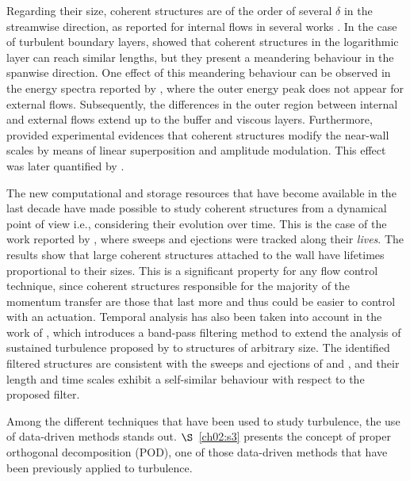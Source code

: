 Regarding their size, coherent structures are of the order of several $\delta$ in the streamwise direction, as reported for internal flows in several works \citep{kim1999very,guala2006large,monty2007large}.
In the case of turbulent boundary layers, \citet{hutchins2007evidence} showed that coherent structures in the logarithmic layer can reach similar lengths, but they present a meandering behaviour in the spanwise direction.
One effect of this meandering behaviour can be observed in the energy spectra reported by \citet{monty2009comparison}, where the outer energy peak does not appear for external flows.
Subsequently, the differences in the outer region between internal and external flows extend up to the buffer and viscous layers.
Furthermore, \citet{hutchins2007large} provided experimental evidences that coherent structures modify the near-wall scales by means of linear superposition and amplitude modulation.
This effect was later quantified by \citet{mathis2009large}.

The new computational and storage resources that have become available in the last decade have made possible to study coherent structures from a dynamical point of view i.e., considering their evolution over time.
This is the case of the work reported by \citet{lozano2014time}, where sweeps and ejections were tracked along their \textit{lives}.
The results show that large coherent structures attached to the wall have lifetimes proportional to their sizes.
This is a significant property for any flow control technique, since coherent structures responsible for the majority of the momentum transfer are those that last more and thus could be easier to control with an actuation.
Temporal analysis has also been taken into account in the work of \citet{encinar2020momentum}, which introduces a band-pass filtering method to extend the analysis of sustained turbulence proposed by \citet{jimenez1991minimal} to structures of arbitrary size.
The identified filtered structures are consistent with the sweeps and ejections of \citet{lozano2012three} and \citet{lozano2014time}, and their length and time scales exhibit a self-similar behaviour with respect to the proposed filter.

Among the different techniques that have been used to study turbulence, the use of data-driven methods stands out.
$\S$~\ref{ch02:s3} presents the concept of proper orthogonal decomposition (POD), one of those data-driven methods that have been previously applied to turbulence.

